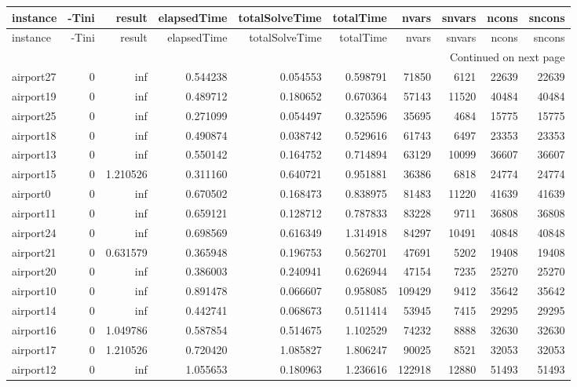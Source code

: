 
\begin{longtable}{|l|r|r|r|r|r|r|r|r|r|}
\toprule
instance & -Tini & result & elapsedTime & totalSolveTime & totalTime & nvars & snvars & ncons & sncons \\
\midrule
\endfirsthead
\toprule
instance & -Tini & result & elapsedTime & totalSolveTime & totalTime & nvars & snvars & ncons & sncons \\
\midrule
\endhead
\midrule
\multicolumn{10}{r}{Continued on next page} \\
\midrule
\endfoot
\bottomrule
\endlastfoot
airport27 & 0 & inf & 0.544238 & 0.054553 & 0.598791 & 71850 & 6121 & 22639 & 22639 \\
airport19 & 0 & inf & 0.489712 & 0.180652 & 0.670364 & 57143 & 11520 & 40484 & 40484 \\
airport25 & 0 & inf & 0.271099 & 0.054497 & 0.325596 & 35695 & 4684 & 15775 & 15775 \\
airport18 & 0 & inf & 0.490874 & 0.038742 & 0.529616 & 61743 & 6497 & 23353 & 23353 \\
airport13 & 0 & inf & 0.550142 & 0.164752 & 0.714894 & 63129 & 10099 & 36607 & 36607 \\
airport15 & 0 & 1.210526 & 0.311160 & 0.640721 & 0.951881 & 36386 & 6818 & 24774 & 24774 \\
airport0 & 0 & inf & 0.670502 & 0.168473 & 0.838975 & 81483 & 11220 & 41639 & 41639 \\
airport11 & 0 & inf & 0.659121 & 0.128712 & 0.787833 & 83228 & 9711 & 36808 & 36808 \\
airport24 & 0 & inf & 0.698569 & 0.616349 & 1.314918 & 84297 & 10491 & 40848 & 40848 \\
airport21 & 0 & 0.631579 & 0.365948 & 0.196753 & 0.562701 & 47691 & 5202 & 19408 & 19408 \\
airport20 & 0 & inf & 0.386003 & 0.240941 & 0.626944 & 47154 & 7235 & 25270 & 25270 \\
airport10 & 0 & inf & 0.891478 & 0.066607 & 0.958085 & 109429 & 9412 & 35642 & 35642 \\
airport14 & 0 & inf & 0.442741 & 0.068673 & 0.511414 & 53945 & 7415 & 29295 & 29295 \\
airport16 & 0 & 1.049786 & 0.587854 & 0.514675 & 1.102529 & 74232 & 8888 & 32630 & 32630 \\
airport17 & 0 & 1.210526 & 0.720420 & 1.085827 & 1.806247 & 90025 & 8521 & 32053 & 32053 \\
airport12 & 0 & inf & 1.055653 & 0.180963 & 1.236616 & 122918 & 12880 & 51493 & 51493 \\

\end{longtable}

